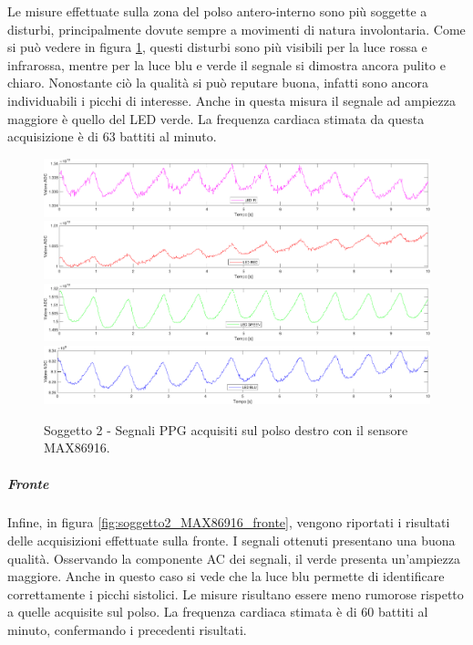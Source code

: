 Le misure effettuate sulla zona del polso antero-interno sono più soggette a disturbi, principalmente dovute sempre a movimenti di natura involontaria. Come si può vedere in figura \ref{fig:soggetto2_MAX86916_polso}, questi disturbi sono più visibili per la luce rossa e infrarossa, mentre per la luce blu e verde il segnale si dimostra ancora pulito e chiaro. Nonostante ciò la qualità si può reputare buona, infatti sono ancora individuabili i picchi di interesse. Anche in questa misura il segnale ad ampiezza maggiore è quello del LED verde. La frequenza cardiaca stimata da questa acquisizione è di 63 battiti al minuto.
\begin{figure}[h]
	\centering
	\includegraphics[width=1\linewidth]{ImageFiles/Misure Preliminari/Soggetto 2/max86916/polso_inferiore_ired}
	\includegraphics[width=1\linewidth]{ImageFiles/Misure Preliminari/Soggetto 2/max86916/polso_inferiore_red}
	\includegraphics[width=1\linewidth]{ImageFiles/Misure Preliminari/Soggetto 2/max86916/polso_inferiore_green}
	\includegraphics[width=1\linewidth]{ImageFiles/Misure Preliminari/Soggetto 2/max86916/polso_inferiore_blu}
	\caption{Soggetto 2 - Segnali PPG acquisiti sul polso destro con il sensore MAX86916.}
	\label{fig:soggetto2_MAX86916_polso}
\end{figure}

\clearpage

\subparagraph{Fronte}
Infine, in figura \ref{fig:soggetto2_MAX86916_fronte}, vengono riportati i risultati delle acquisizioni effettuate sulla fronte. I segnali ottenuti presentano una buona qualità. Osservando la componente AC dei segnali, il verde presenta un'ampiezza maggiore. Anche in questo caso si vede che la luce blu permette di identificare correttamente i picchi sistolici. Le misure risultano essere meno rumorose rispetto a quelle acquisite sul polso. La frequenza cardiaca stimata è di 60 battiti al minuto, confermando i precedenti risultati.

